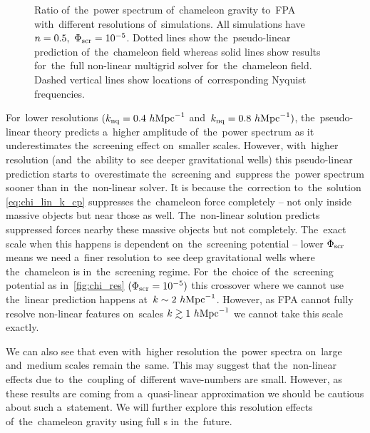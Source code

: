 \begin{figure}[bt]
	\centering
	  \begin{subfigure}{0.85\textwidth}
	  \end{subfigure}
	  \begin{subfigure}{0.85\textwidth}
	  \end{subfigure}
	\caption{Ratio of~the~power spectrum of~chameleon gravity to~FPA with~different resolutions of~simulations. All simulations have $n=0.5,\ \Phi_{\text{\scriptsize scr}}=10^{-5}$. Dotted lines show the~pseudo-linear prediction of~the~chameleon field whereas solid lines show results for~the~full non-linear multigrid solver for~the~chameleon field. Dashed vertical lines show locations of~corresponding Nyquist frequencies.}
	\label{fig:chi_res}
\end{figure}
For~lower resolutions $(k_{\rm nq} = 0.4~h\text{Mpc}^{-1}$ and~$k_{\rm nq} = 0.8~h\text{Mpc}^{-1})$, the~pseudo-linear theory predicts a~higher amplitude of~the~power spectrum as it underestimates the~screening effect on~smaller scales. However, with~higher resolution (and~the~ability to~see deeper gravitational wells) this pseudo-linear prediction starts to~overestimate the~screening and~suppress the~power spectrum sooner than in~the~non-linear solver. It is because the~correction to~the~solution \eqref{eq:chi_lin_k_cp} suppresses the~chameleon force completely -- not only inside massive objects but near those as well. The~non-linear solution predicts suppressed forces nearby these massive objects but not completely. The~exact scale when this happens is dependent on~the~screening potential -- lower $\Phi_{\text{\scriptsize scr}}$ means we need a~finer resolution to~see deep gravitational wells where the~chameleon is in~the~screening regime. For~the~choice of~the~screening potential as in~\autoref{fig:chi_res} $(\Phi_{\text{\scriptsize scr}}=10^{-5})$ this crossover where we cannot use the~linear prediction happens at~$k\sim2~h\text{Mpc}^{-1}$. However, as FPA cannot fully resolve non-linear features on~scales $k\gtrsim1~h\text{Mpc}^{-1}$  we cannot take this scale exactly.

We can also see that even with~higher resolution the~power spectra on~large and~medium scales remain the~same. This may suggest that the~non-linear effects due to~the~coupling of~different wave-numbers are small. However, as these results are coming from a~quasi-linear approximation we should be cautious about such a~statement. We will further explore this resolution effects of~the~chameleon gravity using full \nbodysim s in~the~future.
